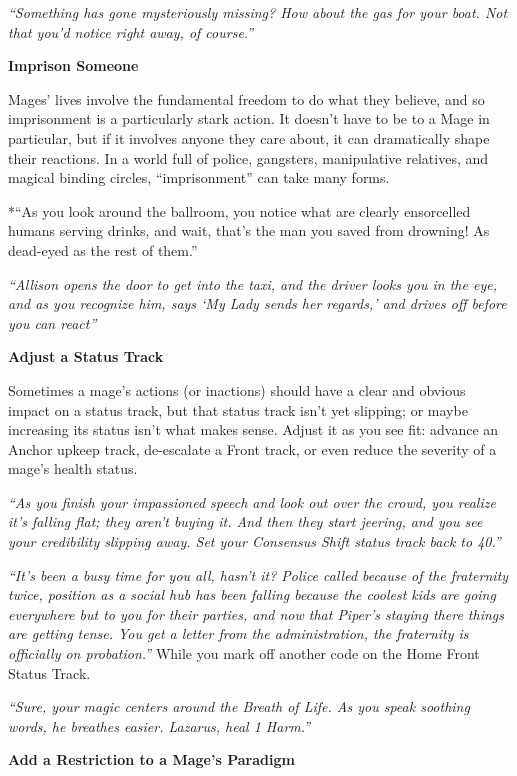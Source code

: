 \documentclass[
  oneside,
  statementpaper,
  9pt]{memoir}
\begin{document}
\emph{``Something has gone mysteriously missing? How about the gas for
your boat. Not that you'd notice right away, of course.''}

\textbf{Imprison Someone}

Mages' lives involve the fundamental freedom to do what they believe,
and so imprisonment is a particularly stark action. It doesn't have to
be to a Mage in particular, but if it involves anyone they care about,
it can dramatically shape their reactions. In a world full of police,
gangsters, manipulative relatives, and magical binding circles,
``imprisonment'' can take many forms.

*``As you look around the ballroom, you notice what are clearly
ensorcelled humans serving drinks, and wait, that's the man you saved
from drowning! As dead-eyed as the rest of them.''

\emph{``Allison opens the door to get into the taxi, and the driver
looks you in the eye, and as you recognize him, says `My Lady sends her
regards,' and drives off before you can react''}

\textbf{Adjust a Status Track}

Sometimes a mage's actions (or inactions) should have a clear and
obvious impact on a status track, but that status track isn't yet
slipping; or maybe increasing its status isn't what makes sense. Adjust
it as you see fit: advance an Anchor upkeep track, de-escalate a Front
track, or even reduce the severity of a mage's health status.

\emph{``As you finish your impassioned speech and look out over the
crowd, you realize it's falling flat; they aren't buying it. And then
they start jeering, and you see your credibility slipping away. Set your
Consensus Shift status track back to 40.''}

\emph{``It's been a busy time for you all, hasn't it? Police called
because of the fraternity twice, position as a social hub has been
falling because the coolest kids are going everywhere but to you for
their parties, and now that Piper's staying there things are getting
tense. You get a letter from the administration, the fraternity is
officially on probation.''} While you mark off another code on the Home
Front Status Track.

\emph{``Sure, your magic centers around the Breath of Life. As you speak
soothing words, he breathes easier. Lazarus, heal 1 Harm.''}

\textbf{Add a Restriction to a Mage's Paradigm}
\end{document}
